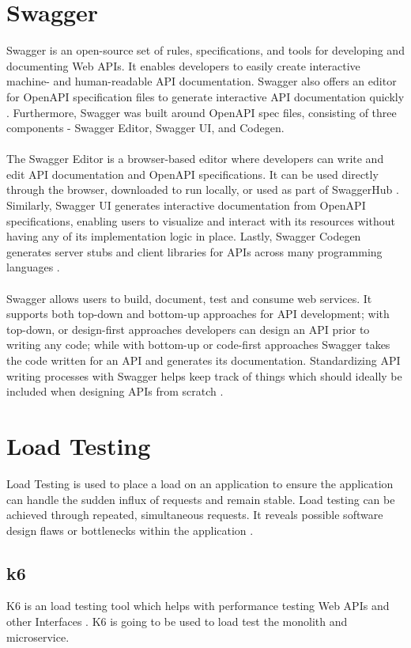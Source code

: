 \documentclass[BIF,Bachelor,nenglish]{twbook}%
\begin{document}
\section{Swagger}
Swagger is an open-source set of rules, specifications, and tools for developing and documenting Web \ac{API}s. It enables developers to easily create interactive machine- and human-readable \ac{API} documentation. Swagger also offers an editor for OpenAPI specification files to generate interactive \ac{API} documentation quickly \cite{javapoint}. Furthermore, Swagger was built around OpenAPI spec files, consisting of three components - Swagger Editor, Swagger UI, and Codegen.
\\
\\
The Swagger Editor is a browser-based editor where developers can write and edit \ac{API} documentation and OpenAPI specifications. It can be used directly through the browser, downloaded to run locally, or used as part of SwaggerHub \cite{hubspot}. Similarly, Swagger UI generates interactive documentation from OpenAPI specifications, enabling users to visualize and interact with its resources without having any of its implementation logic in place. Lastly, Swagger Codegen generates server stubs and client libraries for \ac{API}s across many programming languages \cite{swagger}.
\\
\\
Swagger allows users to build, document, test and consume web services. It supports both top-down and bottom-up approaches for \ac{API} development; with top-down, or design-first approaches developers can design an \ac{API} prior to writing any code; while with bottom-up or code-first approaches Swagger takes the code written for an \ac{API} and generates its documentation. Standardizing \ac{API} writing processes with Swagger helps keep track of things which should ideally be included when designing \ac{API}s from scratch \cite{scaleyourapp}.

\section{Load Testing}
Load Testing is used to place a load on an application to ensure the application can handle the sudden influx of requests and remain stable. Load testing can be achieved through repeated, simultaneous requests. It reveals  possible software design flaws or bottlenecks within the application \cite{loadtest}.
\subsection{k6}
K6 is an load testing tool which helps with performance testing Web \ac{API}s and other Interfaces \cite{k6doc}. K6 is going to be used to load test the monolith and microservice.
\end{document}
